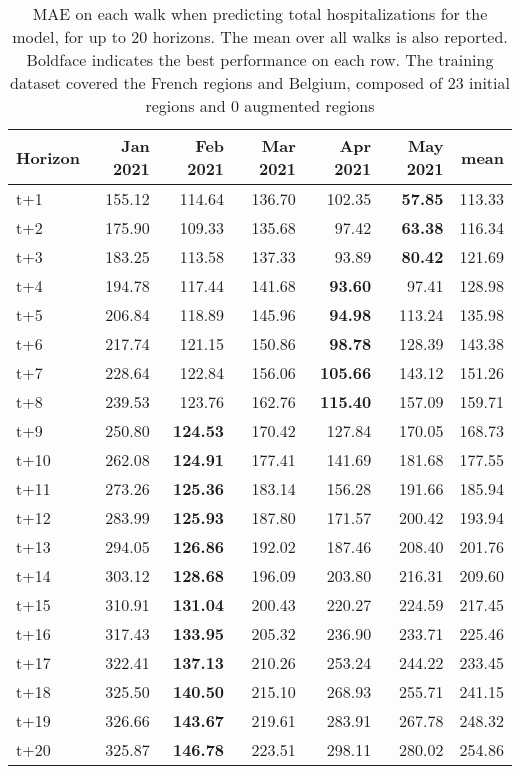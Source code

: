 \begin{table}[H]
\centering
\caption{MAE on each walk when predicting total hospitalizations for the model, for up to 20 horizons. The mean over all walks is also reported. Boldface indicates the best performance on each row. The training dataset covered the French regions and Belgium, composed of 23 initial regions and 0 augmented regions }
\label{tab:MAE_walk_encoder_decoder}
\begin{tabular}{lrrrrrr}
\toprule
Horizon &  Jan 2021 &  Feb 2021 &  Mar 2021 &  Apr 2021 &  May 2021 &   mean \\
\midrule
t+1  & 155.12  & 114.64  & 136.70  & 102.35  & \textbf{57.85}  & 113.33  \\
t+2  & 175.90  & 109.33  & 135.68  & 97.42  & \textbf{63.38}  & 116.34  \\
t+3  & 183.25  & 113.58  & 137.33  & 93.89  & \textbf{80.42}  & 121.69  \\
t+4  & 194.78  & 117.44  & 141.68  & \textbf{93.60}  & 97.41  & 128.98  \\
t+5  & 206.84  & 118.89  & 145.96  & \textbf{94.98}  & 113.24  & 135.98  \\
t+6  & 217.74  & 121.15  & 150.86  & \textbf{98.78}  & 128.39  & 143.38  \\
t+7  & 228.64  & 122.84  & 156.06  & \textbf{105.66}  & 143.12  & 151.26  \\
t+8  & 239.53  & 123.76  & 162.76  & \textbf{115.40}  & 157.09  & 159.71  \\
t+9  & 250.80  & \textbf{124.53}  & 170.42  & 127.84  & 170.05  & 168.73  \\
t+10  & 262.08  & \textbf{124.91}  & 177.41  & 141.69  & 181.68  & 177.55  \\
t+11  & 273.26  & \textbf{125.36}  & 183.14  & 156.28  & 191.66  & 185.94  \\
t+12  & 283.99  & \textbf{125.93}  & 187.80  & 171.57  & 200.42  & 193.94  \\
t+13  & 294.05  & \textbf{126.86}  & 192.02  & 187.46  & 208.40  & 201.76  \\
t+14  & 303.12  & \textbf{128.68}  & 196.09  & 203.80  & 216.31  & 209.60  \\
t+15  & 310.91  & \textbf{131.04}  & 200.43  & 220.27  & 224.59  & 217.45  \\
t+16  & 317.43  & \textbf{133.95}  & 205.32  & 236.90  & 233.71  & 225.46  \\
t+17  & 322.41  & \textbf{137.13}  & 210.26  & 253.24  & 244.22  & 233.45  \\
t+18  & 325.50  & \textbf{140.50}  & 215.10  & 268.93  & 255.71  & 241.15  \\
t+19  & 326.66  & \textbf{143.67}  & 219.61  & 283.91  & 267.78  & 248.32  \\
t+20  & 325.87  & \textbf{146.78}  & 223.51  & 298.11  & 280.02  & 254.86  \\

\bottomrule
\end{tabular}
\end{table}
